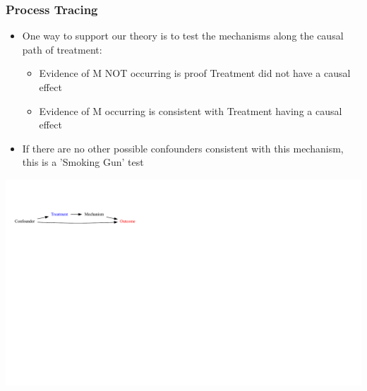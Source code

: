 \documentclass[xcolor=x11names,compress]{beamer}\usepackage[]{graphicx}\usepackage[]{color}
\newenvironment{knitrout}{}{} %
\renewcommand{\(}{\begin{columns}}
\renewcommand{\)}{\end{columns}}
\newcommand{\<}[1]{\begin{column}{#1}}
\renewcommand{\>}{\end{column}}
\begin{document}
\begin{frame}
\frametitle{Process Tracing}
\begin{itemize}
\item One way to support our theory is to test the mechanisms along the causal path of treatment:
\begin{itemize}
\item Evidence of M NOT occurring is proof Treatment did not have a causal effect
\item Evidence of M occurring is consistent with Treatment having a causal effect
\end{itemize}
\item If there are no other possible confounders consistent with this mechanism, this is a 'Smoking Gun' test
\end{itemize}
\begin{knitrout}
\color{fgcolor}
\includegraphics[width=1.8\linewidth]{figure/Dag3b-1} 

\end{knitrout}
\end{frame}
\end{document}
